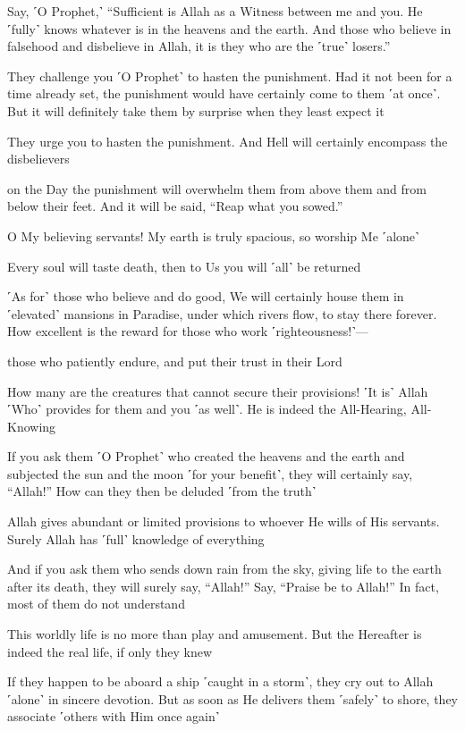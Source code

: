 Say, ˹O Prophet,˺ “Sufficient is Allah as a Witness between me and you. He ˹fully˺ knows whatever is in the heavens and the earth. And those who believe in falsehood and disbelieve in Allah, it is they who are the ˹true˺ losers.”

They challenge you ˹O Prophet˺ to hasten the punishment. Had it not been for a time already set, the punishment would have certainly come to them ˹at once˺. But it will definitely take them by surprise when they least expect it

They urge you to hasten the punishment. And Hell will certainly encompass the disbelievers

on the Day the punishment will overwhelm them from above them and from below their feet. And it will be said, “Reap what you sowed.”

O My believing servants! My earth is truly spacious, so worship Me ˹alone˺

Every soul will taste death, then to Us you will ˹all˺ be returned

˹As for˺ those who believe and do good, We will certainly house them in ˹elevated˺ mansions in Paradise, under which rivers flow, to stay there forever. How excellent is the reward for those who work ˹righteousness!˺—

those who patiently endure, and put their trust in their Lord

How many are the creatures that cannot secure their provisions! ˹It is˺ Allah ˹Who˺ provides for them and you ˹as well˺. He is indeed the All-Hearing, All-Knowing

If you ask them ˹O Prophet˺ who created the heavens and the earth and subjected the sun and the moon ˹for your benefit˺, they will certainly say, “Allah!” How can they then be deluded ˹from the truth˺

Allah gives abundant or limited provisions to whoever He wills of His servants. Surely Allah has ˹full˺ knowledge of everything

And if you ask them who sends down rain from the sky, giving life to the earth after its death, they will surely say, “Allah!” Say, “Praise be to Allah!” In fact, most of them do not understand

This worldly life is no more than play and amusement. But the Hereafter is indeed the real life, if only they knew

If they happen to be aboard a ship ˹caught in a storm˺, they cry out to Allah ˹alone˺ in sincere devotion. But as soon as He delivers them ˹safely˺ to shore, they associate ˹others with Him once again˺

